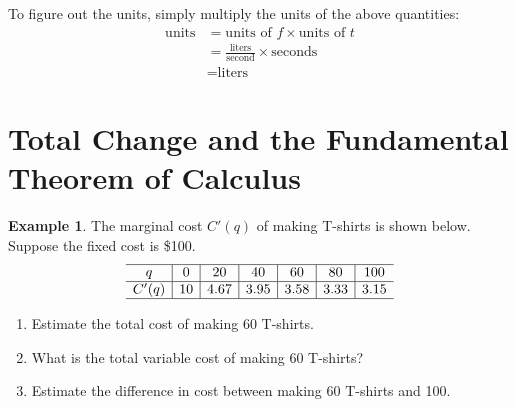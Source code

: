 \documentclass[oneside]{book}
\theoremstyle{definition}
\newtheorem{example}{Example}
\theoremstyle{solution}
\newtheorem*{solution}{Solution}
\newenvironment{solution}{\vspace{2in}\comment}{\endcomment}
\begin{document}
\begin{solution}
\begin{enumerate}
    To figure out the units, simply multiply the units of the above quantities:
    \begin{align*}
      \text{units} & = \text{units of }f \times \text{units of }t\\
                   & = \frac{\text{liters}}{\text{second}}\times \text{seconds}\\
                   & = \text{liters}
    \end{align*}
  \end{enumerate}
\end{solution}

\section{Total Change and the Fundamental Theorem of Calculus}
\begin{example}
The marginal cost $C'(q)$ of making
  T-shirts is shown below. Suppose the fixed cost is \$100.
  $$
  \begin{array}{c|c|c|c|c|c|c}
    \hline
    q     & 0  & 20   & 40   & 60   & 80   & 100  \\ \hline
    C'(q) & 10 & 4.67 & 3.95 & 3.58 & 3.33 & 3.15 \\ \hline
  \end{array}
  $$
\begin{enumerate}
\item Estimate the total cost of making 60 T-shirts.
\item What is the total variable cost of making 60 T-shirts?
\item Estimate the difference in cost between making 60 T-shirts and 100. 
\end{enumerate}
\end{example}
\end{document}
